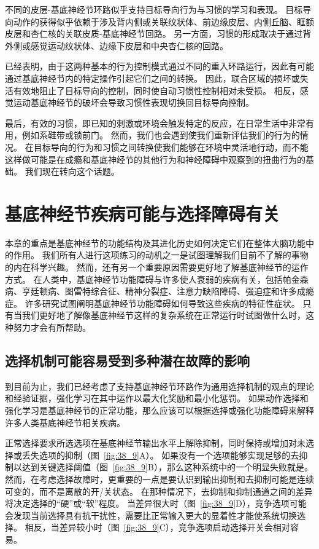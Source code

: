 不同的皮层-基底神经节环路似乎支持目标导向行为与习惯的学习和表现。
目标导向动作的获得似乎依赖于涉及背内侧或关联纹状体、前边缘皮层、内侧丘脑、眶额皮层和杏仁核的关联皮质-基底神经节回路。
另一方面，习惯的形成取决于通过背外侧或感觉运动纹状体、边缘下皮层和中央杏仁核的回路。


已经表明，由于这两种基本的行为控制模式通过不同的重入环路运行，因此有可能通过基底神经节内的特定操作引起它们之间的转换。
因此，联合区域的损坏或失活有效地阻止了目标导向的控制，同时使自动习惯性控制相对未受损。
相反，感觉运动基底神经节的破坏会导致习惯性表现切换回目标导向控制。


最后，有效的习惯，即已知的刺激或环境会触发特定的反应，在日常生活中非常有用，例如系鞋带或锁前门。
然而，我们也会遇到使我们重新评估我们的行为的情况。
在目标导向的行为和习惯之间转换使我们能够在环境中灵活地行动，而不能这样做可能是在成瘾和基底神经节的其他行为和神经障碍中观察到的扭曲行为的基础。
我们现在转向这个话题。



\section{基底神经节疾病可能与选择障碍有关}

本章的重点是基底神经节的功能结构及其进化历史如何决定它们在整体大脑功能中的作用。
我们所有人进行这项练习的动机之一是试图理解我们目前不了解的事物的内在科学兴趣。
然而，还有另一个重要原因需要更好地了解基底神经节的运作方式。
在人类中，基底神经节功能障碍与许多使人衰弱的疾病有关，包括帕金森病、亨廷顿病、图雷特综合征、精神分裂症、注意力缺陷障碍、强迫症和许多成瘾症。
许多研究试图阐明基底神经节功能障碍如何导致这些疾病的特征性症状。
只有当我们更好地了解像基底神经节这样的复杂系统在正常运行时试图做什么时，这种努力才会有所帮助。



\subsection{选择机制可能容易受到多种潜在故障的影响}

到目前为止，我们已经考虑了支持基底神经节环路作为通用选择机制的观点的理论和经验证据，强化学习在其中运作以最大化奖励和最小化惩罚。
如果动作选择和强化学习是基底神经节的正常功能，那么应该可以根据选择或强化功能障碍来解释许多人类基底神经节相关疾病。


正常选择要求所选选项在基底神经节输出水平上解除抑制，同时保持或增加对未选择或丢失选项的抑制（图~\ref{fig:38_9}A）。
如果没有一个选项能够实现足够的去抑制以达到关键选择阈值（图~\ref{fig:38_9}B），那么这种系统中的一个明显失败就是。
然而，在考虑选择故障时，更重要的一点是要认识到输出抑制和去抑制可能是连续可变的，而不是离散的开/关状态。
在那种情况下，去抑制和抑制通道之间的差异将决定选择的“硬”或“软”程度。
当差异很大时（图~\ref{fig:38_9}D），竞争选项可能会发现当前选择具有抗干扰性，需要比正常输入更大的显着性才能使系统切换选择。
相反，当差异较小时（图~\ref{fig:38_9}C），竞争选项启动选择开关会相对容易。


